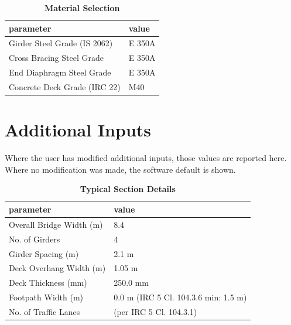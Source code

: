 \documentclass[12pt,a4paper]{report}
\numberwithin{table}{chapter}
\numberwithin{figure}{chapter}
\begin{document}
\begin{table}[H]
\caption{\textbf{Material Selection}}
\label{subsec:material}
\begin{tabular}{|L{5.5cm}|L{8.5cm}|}
\hline
\textbf{parameter} & \textbf{value} \\
\hline
\textnormal{Girder Steel Grade (IS 2062)} & E 350A \\
\hline
\textnormal{Cross Bracing Steel Grade} & E 350A \\
\hline
\textnormal{End Diaphragm Steel Grade} & E 350A \\
\hline
\textnormal{Concrete Deck Grade (IRC 22)} & M40 \\
\hline
\end{tabular}
\end{table}
\vspace{0.4cm}

\newpage
\section{Additional Inputs}
\label{sec:additional-inputs}

Where the user has modified additional inputs, those values are reported here. Where no modification was made, the software default is shown.

\vspace{0.8cm}

\begin{longtable}{|L{5.5cm}|p{10.0cm}|}
\caption{\textbf{Typical Section Details}}
\hline
\textbf{parameter} & \textbf{value} \\
\hline
\textnormal{Overall Bridge Width (m)} & 8.4 \\[6pt]
\hline
\textnormal{No. of Girders} & 4 \\[6pt]
\hline
\textnormal{Girder Spacing (m)} & 2.1 m \\[6pt]
\hline
\textnormal{Deck Overhang Width (m)} & 1.05 m \\[6pt]
\hline
\textnormal{Deck Thickness (mm)} & 250.0 mm \\[6pt]
\hline
\textnormal{Footpath Width (m)} & 0.0 m (IRC 5 Cl. 104.3.6 min: 1.5 m) \\[6pt]
\hline
\textnormal{No. of Traffic Lanes} &  (per IRC 5 Cl. 104.3.1) \\[6pt]
\hline
\end{longtable}

\vspace{0.8em}
\end{document}
